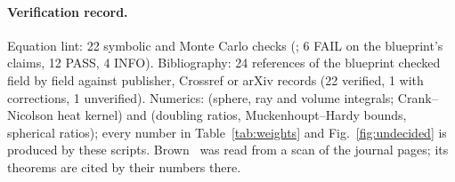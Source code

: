 \documentclass[a4paper,11pt,noarxiv]{quantumarticle}
\theoremstyle{plain}
\theoremstyle{definition}
\theoremstyle{remark}
\begin{document}
\paragraph{Verification record.}
Equation lint: 22 symbolic and Monte Carlo checks
(; 6 FAIL on the
blueprint's claims, 12 PASS, 4 INFO). Bibliography: 24 references of
the blueprint checked field by field against publisher, Crossref or
arXiv records (22 verified, 1 with corrections, 1 unverified).
Numerics:  (sphere, ray and volume
integrals; Crank--Nicolson heat kernel) and
 (doubling ratios,
Muckenhoupt--Hardy bounds, spherical ratios); every number in
Table~\ref{tab:weights} and Fig.~\ref{fig:undecided} is produced by
these scripts. Brown~\cite{brown1971} was read from a scan of the
journal pages; its theorems are cited by their numbers there.



\end{document}
